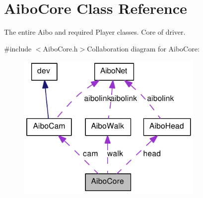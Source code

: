 \hypertarget{classAiboCore}{
\section{AiboCore Class Reference}
\label{classAiboCore}
}


The entire Aibo and required Player classes. Core of driver.  


{\ttfamily \#include $<$AiboCore.h$>$}Collaboration diagram for AiboCore:\nopagebreak
\begin{figure}[H]
\begin{center}
\leavevmode
\includegraphics[width=256pt]{classAiboCore__coll__graph}
\end{center}
\end{figure}
